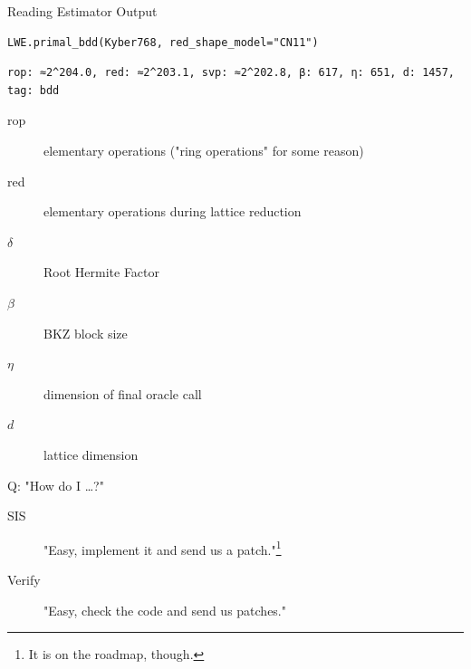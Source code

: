 \documentclass[table,10pt,aspectratio=169]{beamer}
\begin{document}
\begin{frame}[label={sec:orgffca0e7},fragile]{Reading Estimator Output}
 \lstset{language=Python,label= ,caption= ,captionpos=b,numbers=none}
\begin{lstlisting}
LWE.primal_bdd(Kyber768, red_shape_model="CN11")
\end{lstlisting}

\begin{verbatim}
rop: ≈2^204.0, red: ≈2^203.1, svp: ≈2^202.8, β: 617, η: 651, d: 1457, tag: bdd
\end{verbatim}


\begin{description}
\item[{rop}] elementary operations ("ring operations" for some reason)
\item[{red}] elementary operations during lattice reduction
\item[{\(\delta\)}] Root Hermite Factor
\item[{\(\beta\)}] BKZ block size
\item[{\(\eta\)}] dimension of final oracle call
\item[{\(d\)}] lattice dimension
\end{description}
\end{frame}

\begin{frame}[label={sec:org518cd97}]{Q: "How do I …?"}
\begin{description}
\item[{SIS}] "Easy, implement it and send us a patch."\footnote{It is on the roadmap, though.}
\item[{Verify}] "Easy, check the code and send us patches."
\end{description}
\end{frame}
\end{document}
